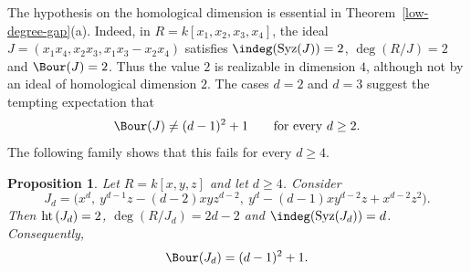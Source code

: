 \documentclass[11pt]{amsart} %
\newtheorem{Proposition}[Theorem]{Proposition}
\theoremstyle{definition}
\def\hht{{\rm ht}\,}
\def\syz{\mbox{\rm Syz}}
\def\hht{{\rm ht}\,}
\begin{document}
The hypothesis on the homological dimension is essential in
Theorem~\ref{low-degree-gap}{\rm(a)}. Indeed, in
$R=k[x_1,x_2,x_3,x_4]$, the ideal $J=(x_1x_4,x_2x_3,x_1x_3-x_2x_4)$ satisfies
$\indeg(\syz(J))=2$, $\deg(R/J)=2$ and $\Bour(J)=2$. Thus the value $2$ is realizable in dimension $4$, although not by an ideal of homological dimension $2$.
The cases $d=2$ and $d=3$ suggest the tempting expectation that
\[
\Bour(J)\neq(d-1)^2+1
\qquad\text{for every }d\ge2.
\]
The following family shows that this fails for every $d\ge4$.


\begin{Proposition}\label{prop:Jd-family}
	Let $R=k[x,y,z]$ and let $d\geq 4$. Consider
	\[
	J_d=\bigl(
	x^d,\ 
	y^{d-1}z-(d-2)xyz^{d-2},\ 
	y^d-(d-1)xy^{d-2}z+x^{d-2}z^2
	\bigr).
	\]
	Then $\hht(J_d)=2$,  $\deg(R/J_d)=2d-2$ and  $\indeg(\syz(J_d))=d$. Consequently,
	\[
	\Bour(J_d)=(d-1)^2+1.
	\]
\end{Proposition}
\end{document}
